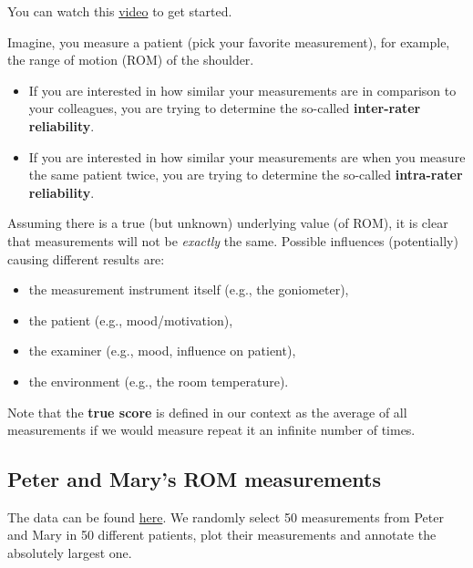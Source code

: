 \documentclass[
]{book}
\providecommand{\tightlist}{%
  \setlength{\itemsep}{0pt}\setlength{\parskip}{0pt}}
\begin{document}
You can watch this \href{https://www.youtube.com/watch?v=9HSoWaRpcys&ab_channel=Physiotutors}{video}
to get started.

Imagine, you measure a patient (pick your favorite measurement), for example,
the range of motion (ROM) of the shoulder.

\begin{itemize}
\tightlist
\item
  If you are interested in how
  similar your measurements are in comparison to your colleagues, you are
  trying to determine the so-called \textbf{inter-rater reliability}.
\item
  If you are interested in how similar your measurements are when you measure
  the same patient twice, you are trying to determine the so-called
  \textbf{intra-rater reliability}.
\end{itemize}

Assuming there is a true (but unknown) underlying value (of ROM),
it is clear that measurements will not be \emph{exactly} the same.
Possible influences (potentially) causing different results are:

\begin{itemize}
\tightlist
\item
  the measurement instrument itself (e.g., the goniometer),
\item
  the patient (e.g., mood/motivation),
\item
  the examiner (e.g., mood, influence on patient),
\item
  the environment (e.g., the room temperature).
\end{itemize}

Note that the \textbf{true score} is defined in our context as the average of all measurements
if we would measure repeat it an infinite number of times.

\subsection{Peter and Mary's ROM measurements}\label{peter-and-marys-rom-measurements}

The data can be found \href{http://www.clinimetrics.nl/answers-to-the-assignments-in-textbook_22_0.html}{here}.
We randomly select 50 measurements from Peter and Mary in 50 different patients,
plot their measurements and annotate the absolutely largest one.
\end{document}
